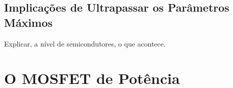 \documentclass[
	portugues %
]{./ppgccufmg}
\begin{document}
		\section{Implicações de Ultrapassar os Parâmetros Máximos}
			Explicar, a nível de semicondutores, o que acontece.

	\chapter{O MOSFET de Potência}
		
	
		
%	
		
	
		
\end{document}
